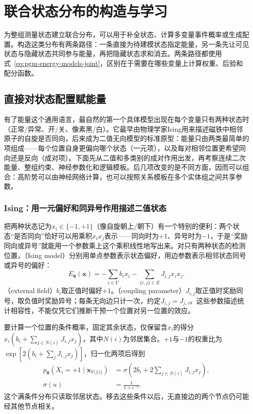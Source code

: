 \section{联合状态分布的构造与学习}
\label{sec:pgm-energy-models-joint-models}

为整组测量状态建立联合分布，可以用于补全状态、计算多变量事件概率或生成配置。构造这类分布有两条路径：一条直接为待建模状态指定能量，另一条先让可见状态与隐藏状态共同参与能量，再把隐藏状态求和消去。两条路径都使用式~\eqref{eq:pgm-energy-models-joint}，区别在于需要在哪些变量上计算权重、后验和配分函数。

\subsection{直接对状态配置赋能量}
\label{sec:pgm-energy-models-pairwise}

有了能量这个通用语言，最自然的第一个具体模型出现在每个变量只有两种状态时（正常/异常、开/关、像素黑/白）。它最早由物理学家Ising用来描述磁铁中相邻原子的自旋是否同向，后来成为二值无向模型的标准原型：能量只由两类最简单的项组成——每个位置自身更偏向哪个状态（一元项），以及每对相邻位置更希望同向还是反向（成对项）。下面先从二值和多类别的成对作用出发，再考察连续二次能量、整组约束、神经参数化和逻辑模板。后几项改变的是不同方面，因而可以组合：高阶势可以由神经网络计算，也可以按照关系模板在多个实体组之间共享参数。

\subsubsection{Ising：用一元偏好和同异号作用描述二值状态}
\label{sec:pgm-energy-models-ising}

把两种状态记为$x_i\in\{-1,+1\}$（像自旋朝上/朝下）有一个特别的便利：两个状态“是否同向”恰好可以用乘积$x_ix_j$表示——同向时为$+1$、异号时为$-1$，于是“奖励同向或异号”就能用一个参数乘上这个乘积线性地写出来。对只有两种状态的检测位置，（Ising model）分别用单点参数表示状态偏好，用边参数表示相邻状态同号或异号的偏好：
\begin{equation}
  E_{\bm{\theta}}(\bm{x})
    =-\sum_{i\in V}b_ix_i
     -\sum_{\{i,j\}\in E}J_{i,j}x_ix_j.
  \label{eq:pgm-energy-models-ising}
\end{equation}
（external field）$b_i$取正值时偏好$+1$。（coupling parameter）$J_{i,j}$取正值时奖励同号，取负值时奖励异号；每条无向边只计一次，约定$J_{i,j}=J_{j,i}$。这些参数描述统计相容性，不能仅凭它们推断干预一个位置对另一位置的效应。

要计算一个位置的条件概率，固定其余状态，仅保留含$x_i$的得分$x_i(b_i+\sum_{j\in N(i)}J_{i,j}x_j)$，其中$N(i)$为邻居集合。$+1$与$-1$的权重比为$\exp[2(b_i+\sum_jJ_{i,j}x_j)]$，归一化两项后得到
\begin{equation}
  \begin{aligned}
    p_{\bm{\theta}}(X_i=+1\mid\bm{x}_{V\setminus\{i\}})
      &=\sigma\!\left(2b_i+
           2\sum_{j\in N(i)}J_{i,j}x_j\right),\\
    \sigma(u)&=\frac{1}{1+e^{-u}}.
  \end{aligned}
  \label{eq:pgm-energy-models-ising-conditional}
\end{equation}
这个满条件分布只读取邻居状态。移去这些条件以后，无直接边的两个节点仍可能经其他节点相关。

